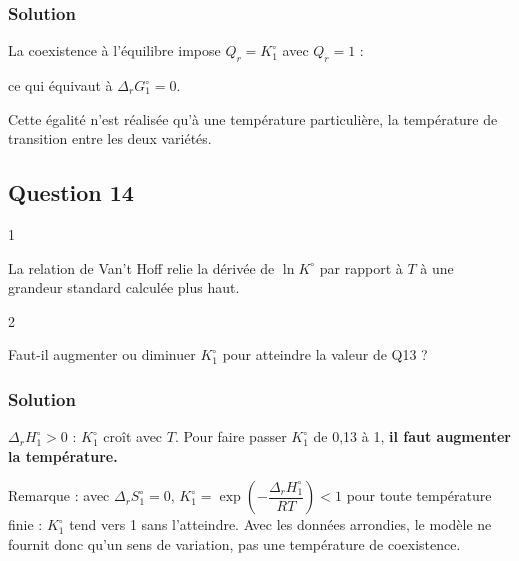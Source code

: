 \documentclass[11pt,a4paper]{article}
\newcommand{\equationajustee}[1]{%
  \sbox{\boiteequation}{$\displaystyle #1$}%
  \ifdim\wd\boiteequation>\linewidth
    \[\resizebox{\linewidth}{!}{\usebox{\boiteequation}}\]%
  \else
    \[#1\]%
  \fi}
\begin{document}
\hypertarget{solution-12}{%
\subsubsection{Solution}\label{solution-12}}

La coexistence à l'équilibre impose \(Q_r = K^\circ_1\) avec \(Q_r = 1\) :

\equationajustee{\boxed{K^\circ_1 = 1}}

ce qui équivaut à \(\Delta_r G^\circ_1 = 0\).

Cette égalité n'est réalisée qu'à une température particulière, la température de transition entre les deux variétés.

\hypertarget{question-14}{%
\subsection{Question 14}\label{question-14}}

\begin{indication}{1}

La relation de Van't Hoff relie la dérivée de \(\ln K^\circ\) par rapport à \(T\) à une grandeur standard calculée plus haut.

\end{indication}

\begin{indication}{2}

Faut-il augmenter ou diminuer \(K^\circ_1\) pour atteindre la valeur de Q13 ?

\end{indication}

\hypertarget{solution-13}{%
\subsubsection{Solution}\label{solution-13}}

\equationajustee{\boxed{\frac{\mathrm d \ln K^\circ}{\mathrm d T} = \frac{\Delta_r H^\circ}{RT^2}}}

\(\Delta_r H^\circ_1 > 0\) : \(K^\circ_1\) croît avec \(T\). Pour faire passer \(K^\circ_1\) de 0,13 à 1, \textbf{il faut augmenter la température.}

Remarque : avec \(\Delta_r S^\circ_1 = 0\), \(K^\circ_1 = \exp\left(-\dfrac{\Delta_r H^\circ_1}{RT}\right) < 1\) pour toute température finie : \(K^\circ_1\) tend vers 1 sans l'atteindre. Avec les données arrondies, le modèle ne fournit donc qu'un sens de variation, pas une température de coexistence.
\end{document}
